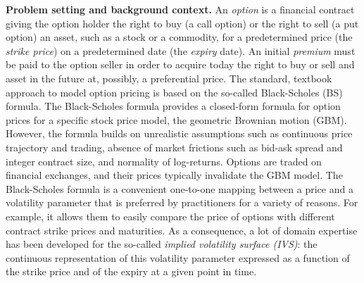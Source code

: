 \textbf{Problem setting and background context.}
An \emph{option} is a financial contract giving the option holder the right to buy (a call option) or the right to sell (a put option) an asset, such as a stock or a commodity, for a predetermined price (the \emph{strike price}) on a predetermined date (the \emph{expiry} date).
An initial \emph{premium} must be paid to the option seller in order to acquire today the right to buy or sell and asset in the future at, possibly, a preferential price.
The standard, textbook approach to model option pricing is based on the so-called Black-Scholes (BS) formula.
The Black-Scholes formula provides a closed-form formula for option prices for a specific stock price model, the geometric Brownian motion (GBM).
However, the formula builds on unrealistic assumptions such as continuous price trajectory and trading, absence of market frictions such as bid-ask spread and integer contract size, and normality of log-returns.
Options are traded on financial exchanges, and their prices typically invalidate the GBM model.
The Black-Scholes formula is a convenient one-to-one mapping between a price and a volatility parameter that is preferred by practitioners for a variety of reasons.
For example, it allows them to easily compare the price of options with different contract strike prices and maturities.
As a consequence, a lot of domain expertise has been developed for the so-called \emph{implied volatility surface (IVS)}: the continuous representation of this volatility parameter expressed as a function of the strike price and of the expiry at a given point in time.
